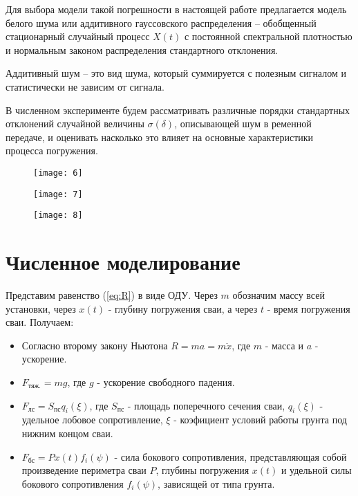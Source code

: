 Для выбора модели такой погрешности в настоящей работе предлагается модель белого шума или аддитивного
гауссовского распределения -- обобщенный стационарный случайный процесс $X(t)$ с постоянной спектральной
плотностью и нормальным законом распределения стандартного отклонения.

\begin{definition}
    Аддитивный шум -- это вид шума, который суммируется с полезным сигналом и статистически не зависим
    от сигнала.
\end{definition}

В численном эксперименте будем рассматривать различные порядки стандартных отклонений случайной
величины $\sigma(\delta)$, описывающей шум в ременной передаче, и оценивать насколько это влияет на
основные характеристики процесса погружения.

\begin{figure}[ht]
    \centering
    \texttt{[image: 6]}
    \label{fig:graph-6}
\end{figure}

\begin{figure}[ht]
    \centering
    \texttt{[image: 7]}
    \label{fig:graph-7}
\end{figure}

\begin{figure}[ht]
    \centering
    \texttt{[image: 8]}
    \label{fig:graph-8}
\end{figure}


\clearpage

\section{Численное моделирование}

Представим равенство (\ref{eq:R}) в виде ОДУ. Через $m$ обозначим массу всей установки, через $x(t)$ - глубину
погружения сваи, а через $t$ - время погружения сваи. Получаем:

\begin{itemize}
\item Согласно второму закону Ньютона $R = ma = m\ddot{x}$, где $m$ - масса и $a$ - ускорение.
\item $F_\text{тяж.} = mg$, где $g$ - ускорение свободного падения.
\item $F_\text{лс} = S_\text{пс} q_i(\xi)$, где $S_\text{пс}$ - площадь поперечного сечения сваи,
$q_i(\xi)$ - удельное лобовое сопротивление, $\xi$ - коэфициент условий работы грунта под нижним концом сваи.
\item $F_\text{бс} = P x(t) f_i(\psi)$ - сила бокового сопротивления, представляющая собой произведение периметра сваи
$P$, глубины погружения $x(t)$ и удельной силы бокового сопротивления $f_i(\psi)$, зависящей от типа грунта.
\end{itemize}

